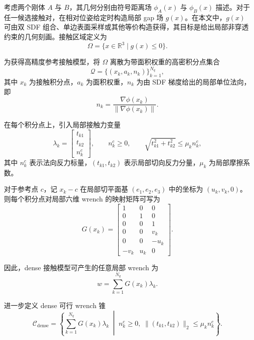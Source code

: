 考虑两个刚体 $A$ 与 $B$，其几何分别由符号距离场 $\phi_A(x)$ 与 $\phi_B(x)$ 描述。对于任一候选接触对，在相对位姿给定时构造局部 gap 场 $g(x)$。在本文中，$g(x)$ 可由双 SDF 组合、单边表面采样或其他等价构造获得，其目标是给出局部非穿透约束的几何刻画。接触区域定义为
\begin{equation}
\Omega = \{x \in \mathbb{R}^3 \mid g(x) \le 0\}.
\end{equation}

为获得高精度参考接触模型，将 $\Omega$ 离散为带面积权重的高密积分点集合
\begin{equation}
\mathcal{Q} = \{(x_k, a_k, n_k)\}_{k=1}^{N_q},
\end{equation}
其中 $x_k$ 为接触积分点，$a_k$ 为面积权重，$n_k$ 为由 SDF 梯度给出的局部单位法向，即
\begin{equation}
 n_k = \frac{\nabla \phi(x_k)}{\|\nabla \phi(x_k)\|}.
\end{equation}

在每个积分点上，引入局部接触力变量
\begin{equation}
\lambda_k =
\begin{bmatrix}
 t_{k1} \\
 t_{k2} \\
 n_k^c
\end{bmatrix},
\qquad
n_k^c \ge 0,
\qquad
\sqrt{t_{k1}^2 + t_{k2}^2} \le \mu_k n_k^c,
\end{equation}
其中 $n_k^c$ 表示法向反力标量，$(t_{k1}, t_{k2})$ 表示局部切向反力分量，$\mu_k$ 为局部摩擦系数。

对于参考点 $c$，记 $x_k-c$ 在局部切平面基 $(e_1,e_2,e_3)$ 中的坐标为 $(u_k,v_k,0)$。则每个积分点对局部六维 wrench 的映射矩阵可写为
\begin{equation}
G(x_k) =
\begin{bmatrix}
1 & 0 & 0 \\
0 & 1 & 0 \\
0 & 0 & 1 \\
0 & 0 & v_k \\
0 & 0 & -u_k \\
-v_k & u_k & 0
\end{bmatrix}.
\end{equation}

因此，dense 接触模型可产生的任意局部 wrench 为
\begin{equation}
 w = \sum_{k=1}^{N_q} G(x_k)\lambda_k.
\end{equation}

进一步定义 dense 可行 wrench 锥
\begin{equation}
\mathcal{C}_{\mathrm{dense}}
=
\left\{
\sum_{k=1}^{N_q} G(x_k)\lambda_k
\;\middle|\;
 n_k^c \ge 0,\;
 \|(t_{k1},t_{k2})\|_2 \le \mu_k n_k^c
\right\}.
\end{equation}

